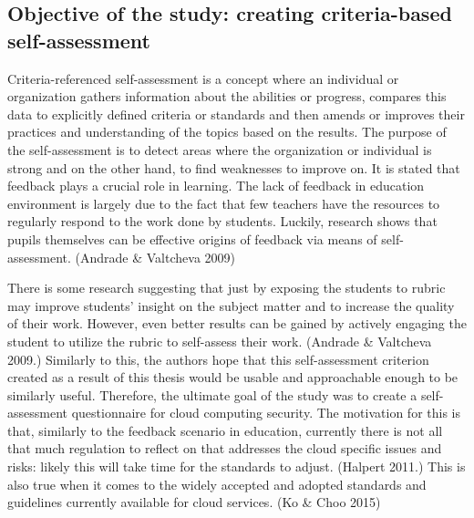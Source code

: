 \documentclass{article}
\begin{document}
\subsection{Objective of the study: creating criteria-based self-assessment}
Criteria-referenced self-assessment is a concept where an individual or organization gathers information about the abilities or progress, compares this data to explicitly defined criteria or standards and then amends or improves their practices and understanding of the topics based on the results.
The purpose of the self-assessment is to detect areas where the organization or individual is strong and on the other hand, to find weaknesses to improve on. It is stated that feedback plays a crucial role in learning. 
The lack of feedback in education environment is largely due to the fact that few teachers have the resources to regularly respond to the work done by students. Luckily, research shows that pupils themselves can be effective origins of feedback via means of self-assessment. (Andrade \& Valtcheva 2009)
\par
There is some research suggesting that just by exposing the students to rubric may improve students' insight on the subject matter and to increase the quality of their work. However, even better results can be gained by actively engaging the student to utilize the rubric to self-assess their work. (Andrade \& Valtcheva 2009.) Similarly to this, the authors hope that this self-assessment criterion created as a result of this thesis would be usable and approachable enough to be similarly useful. 
Therefore, the ultimate goal of the study was to create a self-assessment questionnaire for cloud computing security. The motivation for this is that, similarly to the feedback scenario in education, currently there is not all that much regulation to reflect on that addresses the cloud specific issues and risks: likely this will take time for the standards to adjust. (Halpert 2011.) This is also true when it comes to the widely accepted and adopted standards and guidelines currently available for cloud services. (Ko \& Choo 2015)
\end{document}
